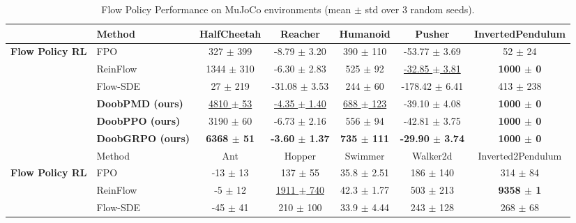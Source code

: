 \begin{table}[t]
\centering
\small
\setlength{\tabcolsep}{3.5pt}
\renewcommand{\arraystretch}{0.95}
\caption{\small Flow Policy Performance on MuJoCo environments (mean $\pm$ std over 3 random seeds).}
\label{tab:mujoco_flow_grouped}
\begin{adjustbox}{max width=\textwidth}
\begin{tabular}{llccccc}
\toprule
& Method
& HalfCheetah
& Reacher
& Humanoid
& Pusher
& InvertedPendulum \\
\midrule

\multirow{6}{*}{\textbf{Flow Policy RL}}
& FPO
& 327 $\pm$ 399
& -8.79 $\pm$ 3.20
& 390 $\pm$ 110
& -53.77 $\pm$ 3.69
& 52 $\pm$ 24 \\

& ReinFlow
& 1344 $\pm$ 310
& -6.30 $\pm$ 2.83
& 525 $\pm$ 92
& \underline{-32.85 $\pm$ 3.81}
& \textbf{1000 $\pm$ 0} \\

& Flow-SDE
& 27 $\pm$ 219
& -31.08 $\pm$ 3.53
& 244 $\pm$ 60
& -178.42 $\pm$ 6.41
& 413 $\pm$ 238 \\

& \textbf{DoobPMD (ours)}
& \underline{4810 $\pm$ 53}
& \underline{-4.35 $\pm$ 1.40}
& \underline{688 $\pm$ 123}
& -39.10 $\pm$ 4.08
& \textbf{1000 $\pm$ 0} \\

& \textbf{DoobPPO (ours)}
& 3190 $\pm$ 60
& -6.73 $\pm$ 2.16
& 556 $\pm$ 94
& -42.81 $\pm$ 3.75
& \textbf{1000 $\pm$ 0} \\

& \textbf{DoobGRPO (ours)}
& \textbf{6368 $\pm$ 51}
& \textbf{-3.60 $\pm$ 1.37}
& \textbf{735 $\pm$ 111}
& \textbf{-29.90 $\pm$ 3.74}
& \textbf{1000 $\pm$ 0} \\

\midrule

& Method
& Ant
& Hopper
& Swimmer
& Walker2d
& Inverted2Pendulum \\
\midrule

\multirow{6}{*}{\textbf{Flow Policy RL}}
& FPO
& -13 $\pm$ 13
& 137 $\pm$ 55
& 35.8 $\pm$ 2.51
& 186 $\pm$ 140
& 314 $\pm$ 84 \\

& ReinFlow
& -5 $\pm$ 12
& \underline{1911 $\pm$ 740}
& 42.3 $\pm$ 1.77
& 503 $\pm$ 213
& \textbf{9358 $\pm$ 1} \\

& Flow-SDE
& -45 $\pm$ 41
& 210 $\pm$ 100
& 33.9 $\pm$ 4.44
& 243 $\pm$ 128
& 268 $\pm$ 68 \\


\end{tabular}
\end{adjustbox}
\end{table}
